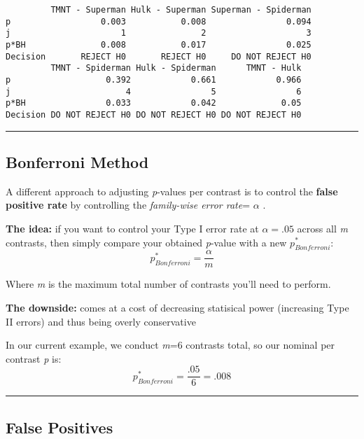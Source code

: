 \documentclass[]{article}
\begin{document}
\begin{verbatim}
         TMNT - Superman Hulk - Superman Superman - Spiderman
p                  0.003           0.008                0.094
j                      1               2                    3
p*BH               0.008           0.017                0.025
Decision       REJECT H0       REJECT H0     DO NOT REJECT H0
         TMNT - Spiderman Hulk - Spiderman      TMNT - Hulk
p                   0.392            0.661            0.966
j                       4                5                6
p*BH                0.033            0.042             0.05
Decision DO NOT REJECT H0 DO NOT REJECT H0 DO NOT REJECT H0
\end{verbatim}

\begin{center}\rule{0.5\linewidth}{\linethickness}\end{center}

\hypertarget{bonferroni-method}{%
\subsection{Bonferroni Method}\label{bonferroni-method}}

A different approach to adjusting \emph{p}-values per contrast is to
control the \textbf{false positive rate} by controlling the
\emph{family-wise error rate}= \(\alpha\) .

\textbf{The idea:} if you want to control your Type I error rate at
\(\alpha=.05\) across all \emph{m} contrasts, then simply compare your
obtained \emph{p}-value with a new \(p_{Bonferroni}^*\):
\[p_{Bonferroni}^*=\frac{\alpha}{m}\]

Where \emph{m} is the maximum total number of contrasts you'll need to
perform.

\textbf{The downside:} comes at a cost of decreasing statisical power
(increasing Type II errors) and thus being overly conservative

In our current example, we conduct \emph{m}=6 contrasts total, so our
nominal per contrast \emph{p} is:
\[p_{Bonferroni}^*=\frac{.05}{6}=.008\]

\begin{center}\rule{0.5\linewidth}{\linethickness}\end{center}

\hypertarget{false-positives}{%
\subsection{False Positives}\label{false-positives}}
\end{document}
